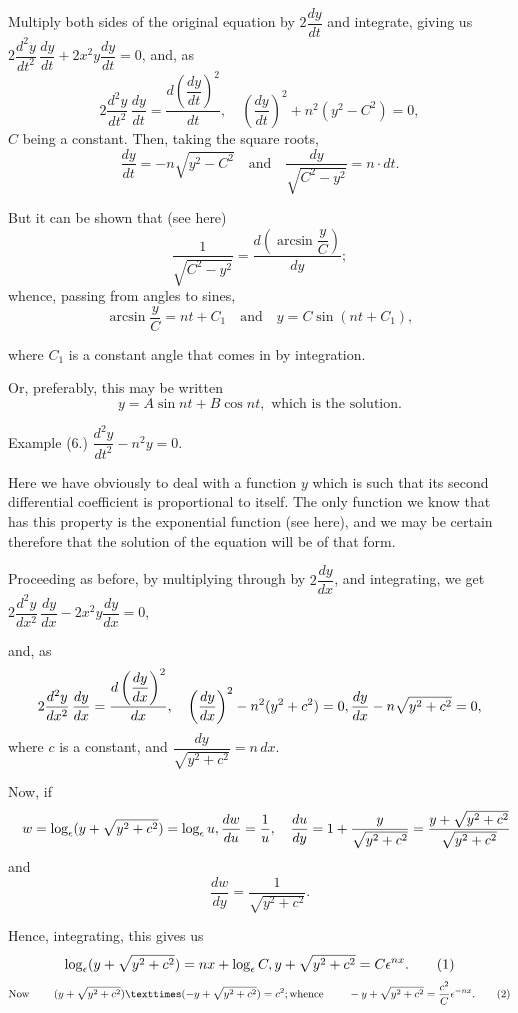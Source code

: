 \documentclass{ximera}
\begin{document}
Multiply both sides of the original equation by $2\dfrac{dy}{dt}$
and integrate, giving us $2\dfrac{d^2 y}{dt^2}\, \dfrac{dy}{dt} + 2x^2 y \dfrac{dy}{dt} = 0$, and, as
\[
2 \frac{d^2y}{dt^2}\, \frac{dy}{dt}
  = \frac{d \left(\dfrac{dy}{dt}\right)^2}{dt},\quad
\left(\frac{dy}{dt}\right)^2 + n^2 (y^2-C^2) = 0,
\]
$C$ being a constant. Then, taking the square roots,
\[
\frac{dy}{dt} = -n \sqrt{ y^2 - C^2}\quad \text{and}\quad
\frac{dy}{\sqrt{C^2 - y^2}} = n · dt.
\]

But it can be shown that (see here)
\[
\frac{1}{\sqrt{C^2 - y^2}} = \frac{d (\arcsin \dfrac{y}{C})}{dy};
\]
whence, passing from angles to sines,
\[
\arcsin \frac{y}{C} = nt + C_1\quad \text{and}\quad y = C \sin (nt + C_1),
\]

where $C_1$ is a constant angle that comes in by integration.

Or, preferably, this may be written
\[
y = A \sin nt + B \cos nt, \text{ which is the solution.}
\]


Example (6.) $\dfrac{d^2 y}{dt^2} - n^2 y = 0$.

Here we have obviously to deal with a function $y$
which is such that its second differential coefficient is
proportional to itself. The only function we know
that has this property is the exponential function
(see here), and we may be certain therefore that the
solution of the equation will be of that form.

Proceeding as before, by multiplying through by
$2 \dfrac{dy}{dx}$, and integrating, we get $2\dfrac{d^2 y}{dx^2}\, \dfrac{dy}{dx} - 2x^2 y \dfrac{dy}{dx}=0$,

 and, as
\[
2\frac{d^2 y}{dx^2}\, \frac{dy}{dx}
  = \frac{d \left(\dfrac{dy}{dx}\right)^2}{dx},\quad
\left(\frac{dy}{dx}\right)^2 - n^2 (y^2 + c^2) = 0, \\
\frac{dy}{dx} - n \sqrt{y^2 + c^2} = 0,
\]
where $c$ is a constant, and $\dfrac{dy}{\sqrt{y^2 + c^2}} = n\, dx$.

Now, if
\[
\quad w = \log_\epsilon ( y+ \sqrt{y^2+ c^2}) = \log_\epsilon u,\\
\frac{dw}{du} = \frac{1}{u},\quad \frac{du}{dy} = 1 + \frac{y}{\sqrt{y^2 + c^2}} = \frac{y + \sqrt{ y^2 + c^2}}{\sqrt{y^2 + c^2}} \\
\]
 and
\[
 \frac{dw}{dy} = \frac{1}{\sqrt{ y^2 + c^2}}.
\]

Hence, integrating, this gives us
\[
\log_\epsilon (y + \sqrt{y^2 + c^2} ) = nx + \log_\epsilon C, \\
y + \sqrt{y^2 + c^2} = C \epsilon^{nx}.
\tag*{(1)}  \\
\]
\[
   \text{Now}\;  \qquad ( y + \sqrt{y^2 + c^2} ) × ( -y + \sqrt{y^2 + c^2} ) = c^2 ;    \\
  \text{whence}\;  \qquad  -y + \sqrt{y^2 + c^2} = \dfrac{c^2}{C} \epsilon^{-nx}.
\tag*{(2)}
\]
\end{document}

